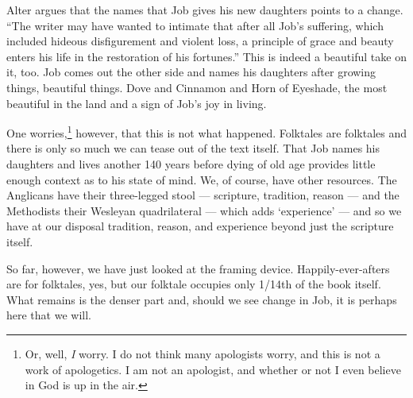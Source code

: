 Alter argues that the names that Job gives his new daughters points to a change. ``The writer may have wanted to intimate that after all Job's suffering, which included hideous disfigurement and violent loss, a principle of grace and beauty enters his life in the restoration of his fortunes.'' \parencite[579]{alter} This is indeed a beautiful take on it, too. Job comes out the other side and names his daughters after growing things, beautiful things. Dove and Cinnamon and Horn of Eyeshade, the most beautiful in the land and a sign of Job's joy in living.

One worries,\footnote{Or, well, \emph{I} worry. I do not think many apologists worry, and this is not a work of apologetics. I am not an apologist, and whether or not I even believe in God is up in the air.} however, that this is not what happened. Folktales are folktales and there is only so much we can tease out of the text itself. That Job names his daughters and lives another 140 years before dying of old age provides little enough context as to his state of mind. We, of course, have other resources. The Anglicans have their three-legged stool --- scripture, tradition, reason --- and the Methodists their Wesleyan quadrilateral --- which adds `experience' --- and so we have at our disposal tradition, reason, and experience beyond just the scripture itself.

So far, however, we have just looked at the framing device. Happily-ever-afters are for folktales, yes, but our folktale occupies only 1/14th of the book itself. What remains is the denser part and, should we see change in Job, it is perhaps here that we will.
